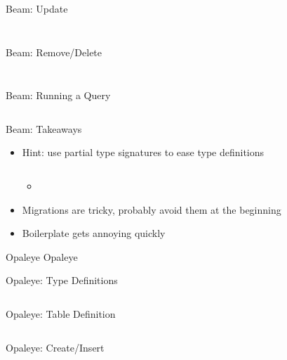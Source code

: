 \documentclass[hyperref={pdfpagelabels=false},12pt]{beamer}
\newcommand{\unnamedUrl}[1]{\href{#1}{\color{blue}{#1}}}
\newcommand{\pygment}[3]{
  \inputminted[frame=single,framesep=2mm,linenos,fontsize=#1]{#2}{#3}
}
\newcommand{\pygmentLines}[5]{
  \inputminted[frame=single,framesep=2mm,linenos,fontsize=#1,firstline=#2,lastline=#3,autogobble]{#4}{#5}
}
\begin{document}
\begin{frame}{Beam: Update}
  \pygmentLines{\scriptsize}{150}{159}{haskell}{code/beam/src/Person.hs}
  \pygment{\scriptsize}{sql}{code/sql/updateSetWhere.sql}
\end{frame}

\begin{frame}{Beam: Remove/Delete}
  \pygmentLines{\scriptsize}{161}{168}{haskell}{code/beam/src/Person.hs}
  \pygment{\scriptsize}{sql}{code/sql/deleteWhere.sql}
\end{frame}

\begin{frame}{Beam: Running a Query}
  \pygmentLines{\scriptsize}{37}{42}{haskell}{code/beam/test/Spec.hs}
\end{frame}

\begin{frame}{Beam: Takeaways}
  \begin{itemize}
    \item Hint: use partial type signatures to ease type definitions
      \pygment{\scriptsize}{haskell}{code/partialTypeSigs.hs}
    \begin{itemize}
      \item \unnamedUrl{https://github.com/barrymoo/slurm-proposals/blob/master/src/Queries.hs\#L31}
    \end{itemize}
    \item Migrations are tricky, probably avoid them at the beginning
    \item Boilerplate gets annoying quickly
  \end{itemize}
\end{frame}

\begin{frame}{Opaleye}
  \centering \Huge Opaleye
\end{frame}

\begin{frame}{Opaleye: Type Definitions}
  \pygmentLines{\scriptsize}{42}{62}{haskell}{code/opaleye-example/src/Person.hs}
\end{frame}

\begin{frame}{Opaleye: Table Definition}
  \pygmentLines{\scriptsize}{66}{86}{haskell}{code/opaleye-example/src/Person.hs}
\end{frame}

\begin{frame}{Opaleye: Create/Insert}
  \pygmentLines{\scriptsize}{98}{111}{haskell}{code/opaleye-example/src/Person.hs}
  \pygment{\scriptsize}{sql}{code/sql/insertInto.sql}
\end{frame}
\end{document}
